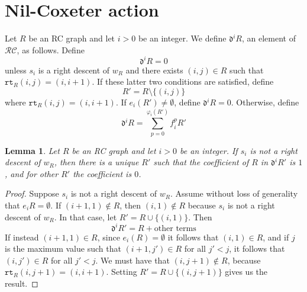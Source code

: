 \documentclass{amsart}
\newtheorem{lemma}{Lemma}[subsection]
\theoremstyle{definition}
\newtheorem{definition}[lemma]{Definition}
\theoremstyle{remark}
\numberwithin{equation}{subsection}
\newcommand{\wof}[1]{w_{#1}}
\newcommand{\rcdd}{\mathfrak{d}}
\newcommand{\rtt}{\mathtt{rt}}
\newcommand{\RC}{\mathcal{RC}}
\begin{document}


\section{Nil-Coxeter action}

Let $R$ be an RC graph and let $i>0$ be an integer. We define $\rcdd^iR$, an element of $\RC$, as follows. Define
$$\rcdd^iR=0$$
unless $s_i$ is a right descent of $\wof{R}$ and there exists $(i,j)\in R$ such that $\rtt_R(i, j) = (i, i+1)$. If these latter two conditions are satisfied, define 
$$R'=R\setminus \{(i, j)\}$$
where $\rtt_R(i,j) = (i, i+1)$. If $e_i(R')\neq \emptyset$, define $\rcdd^iR=0$. Otherwise, define
$$\rcdd^iR = \sum_{p=0}^{\varphi_i(R')}f_i^pR'$$
\begin{lemma} \label{lemma:divdiffunique}
	Let $R$ be an RC graph and let $i>0$ be an integer. If $s_i$ is not a right descent of $\wof{R}$, then there is a unique $R'$ such that the coefficient of $R$ in $\rcdd^iR'$ is $1$, and for other $R'$ the coefficient is $0$.
\end{lemma}
\begin{proof}
	Suppose $s_i$ is not a right descent of $\wof{R}$. Assume without loss of generality that $e_iR = \emptyset$. If $(i+1, 1)\notin R$, then $(i,1)\notin R$ because $s_i$ is not a right descent of $\wof{R}$. In that case, let $R' = R\cup\{(i,1)\}$. Then 
	$$\rcdd^iR' = R + \text{other terms}$$ 
	If instead $(i+1, 1)\in R$, since $e_i(R)=\emptyset$ it follows that $(i, 1)\in R$, and if $j$ is the maximum value such that $(i+1,j')\in R$ for all $j'<j$, it follows that $(i,j')\in R$ for all $j'<j$. We must have that $(i,j+1)\notin R$, because $\rtt_R(i, j+1)=(i, i+1)$. Setting $R'=R\cup \{(i, j+1)\}$ gives us the result.
\end{proof}
\end{document}

